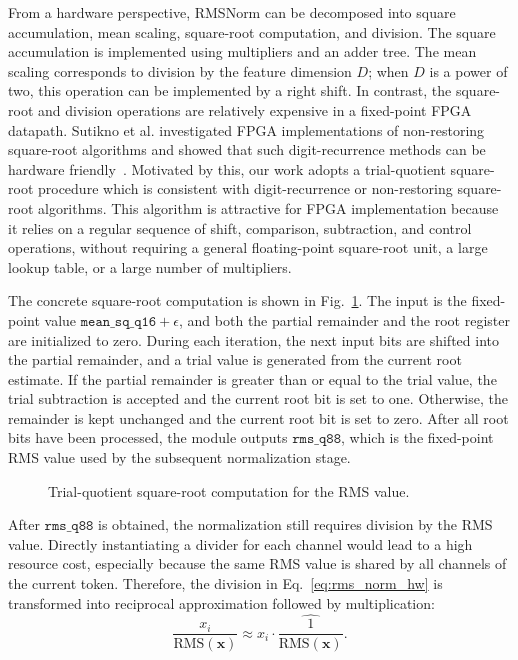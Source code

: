 \documentclass[11pt,twoside]{eitExjobb}
\begin{document}
From a hardware perspective, RMSNorm can be decomposed into square accumulation, mean
scaling, square-root computation, and division. The square accumulation is implemented
using multipliers and an adder tree. The mean scaling corresponds to division by the
feature dimension \(D\); when \(D\) is a power of two, this operation can be
implemented by a right shift. In contrast, the square-root and division operations are
relatively expensive in a fixed-point FPGA datapath. Sutikno et
al. investigated FPGA implementations of non-restoring
square-root algorithms and showed that such digit-recurrence methods can be
hardware friendly~\cite{cite:Sutikno2014Sqrt}. Motivated by this, our work 
adopts a trial-quotient square-root procedure which is consistent with digit-recurrence 
or non-restoring square-root algorithms. This algorithm is attractive for FPGA
implementation because it relies on a regular sequence of shift, comparison,
subtraction, and control operations, without requiring a general floating-point
square-root unit, a large lookup table, or a large number of multipliers.

The concrete square-root computation is shown in Fig.~\ref{fig:trial_quotient_sqrt}.
The input is the fixed-point value \(\texttt{mean\_sq\_q16}+\epsilon\), and both the
partial remainder and the root register are initialized to zero. During each
iteration, the next input bits are shifted into the partial remainder, and a trial
value is generated from the current root estimate. If the partial remainder is greater
than or equal to the trial value, the trial subtraction is accepted and the current
root bit is set to one. Otherwise, the remainder is kept unchanged and the current
root bit is set to zero. After all root bits have been processed, the module outputs
\(\texttt{rms\_q88}\), which is the fixed-point RMS value used by the subsequent
normalization stage.

\begin{figure}[H]
  \centering
  
  \caption{Trial-quotient square-root computation for the RMS value.}
  \label{fig:trial_quotient_sqrt}
\end{figure}

After \(\texttt{rms\_q88}\) is obtained, the normalization still requires division by
the RMS value. Directly instantiating a divider for each channel would lead to a high
resource cost, especially because the same RMS value is shared by all channels of the
current token. Therefore, the division in Eq.~\eqref{eq:rms_norm_hw} is transformed
into reciprocal approximation followed by multiplication:
\begin{equation}
\frac{x_i}{\mathrm{RMS}(\mathbf{x})}
\approx
x_i \cdot
\widehat{\frac{1}{\mathrm{RMS}(\mathbf{x})}} .
\label{eq:rms_reciprocal_mult}
\end{equation}
\end{document}
